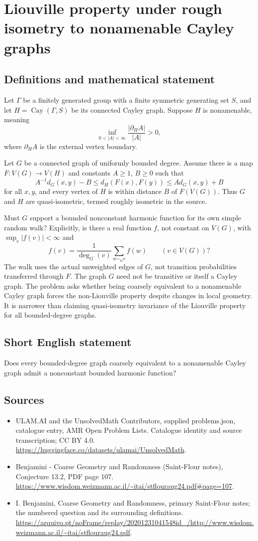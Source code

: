 \documentclass[11pt,a4paper]{article}
\begin{document}
\section*{Liouville property under rough isometry to nonamenable Cayley graphs}\label{statement}

\subsection{Definitions and mathematical statement}
Let $\Gamma$ be a finitely generated group with a finite symmetric generating set $S$, and let $H=\operatorname{Cay}(\Gamma,S)$ be its connected Cayley graph. Suppose $H$ is nonamenable, meaning
\[
\inf_{0<|A|<\infty}\frac{|\partial_H A|}{|A|}>0,
\]
where $\partial_H A$ is the external vertex boundary.

Let $G$ be a connected graph of uniformly bounded degree. Assume there is a map $F:V(G)\to V(H)$ and constants $A\ge1$, $B\ge0$ such that
\[
A^{-1}d_G(x,y)-B\le d_H(F(x),F(y))\le A d_G(x,y)+B
\]
for all $x,y$, and every vertex of $H$ is within distance $B$ of $F(V(G))$. Thus $G$ and $H$ are quasi-isometric, termed roughly isometric in the source.

Must $G$ support a bounded nonconstant harmonic function for its own simple random walk? Explicitly, is there a real function $f$, not constant on $V(G)$, with $\sup_v|f(v)|<\infty$ and
\[
f(v)=\frac1{\deg_G(v)}\sum_{w\sim_Gv}f(w)\qquad(v\in V(G))?
\]
The walk uses the actual unweighted edges of $G$, not transition probabilities transferred through $F$. The graph $G$ need not be transitive or itself a Cayley graph. The problem asks whether being coarsely equivalent to a nonamenable Cayley graph forces the non-Liouville property despite changes in local geometry. It is narrower than claiming quasi-isometry invariance of the Liouville property for all bounded-degree graphs.
\subsection{Short English statement}
Does every bounded-degree graph coarsely equivalent to a nonamenable Cayley graph admit a nonconstant bounded harmonic function?
\subsection{Sources}
\begin{itemize}
\item[S1] ULAM.AI and the UnsolvedMath Contributors, supplied problems.json, catalogue entry, AMR Open Problem Lists. Catalogue identity and source transcription; CC BY 4.0.
\url{https://huggingface.co/datasets/ulamai/UnsolvedMath}.
\item[S2] Benjamini - Coarse Geometry and Randomness (Saint-Flour notes), Conjecture 13.2, PDF page 107. 
\url{https://www.wisdom.weizmann.ac.il/~itai/stflouraug24.pdf#page=107}.
\item[S3] I. Benjamini, Coarse Geometry and Randomness, primary Saint-Flour notes; the numbered question and its surrounding definitions.
\url{https://arquivo.pt/noFrame/replay/20201231041548id_/http://www.wisdom.weizmann.ac.il/~itai/stflouraug24.pdf}.
\end{itemize}
\end{document}
